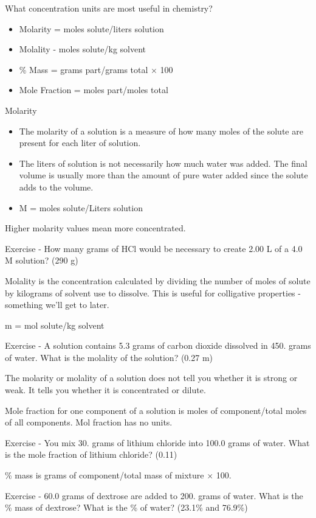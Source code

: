 \documentclass[../hchem.tex]{subfiles}
\begin{document}
What concentration units are most useful in chemistry?
\begin{itemize}
    \item Molarity = moles solute/liters solution 
    \item Molality - moles solute/kg solvent 
    \item \% Mass = grams part/grams total $\times$ 100 
    \item Mole Fraction = moles part/moles total 
\end{itemize}

Molarity 
\begin{itemize}
    \item The molarity of a solution is a measure of how many moles of the solute are present for each liter of solution.
    \item The liters of solution is not necessarily how much water was added. The final volume is usually more than the amount of pure water added since the solute adds to the volume.
    \item M = moles solute/Liters solution 
\end{itemize}

Higher molarity values mean more concentrated.

Exercise - How many grams of HCl would be necessary to create 2.00 L of a 4.0 M solution? (290 g)

Molality is the concentration calculated by dividing the number of moles of solute by kilograms of solvent use to dissolve.
This is useful for colligative properties - something we'll get to later.

m = mol solute/kg solvent 

Exercise - A solution contains 5.3 grams of carbon dioxide dissolved in 450. grams of water. What is the molality of the solution? (0.27 m)

The molarity or molality of a solution does not tell you whether it is strong or weak. It tells you whether it is concentrated or dilute.

Mole fraction for one component of a solution is moles of component/total moles of all components. Mol fraction has no units.

Exercise - You mix 30. grams of lithium chloride into 100.0 grams of water. What is the mole fraction of lithium chloride? (0.11)

\% mass is grams of component/total mass of mixture $\times$ 100.

Exercise - 60.0 grams of dextrose are added to 200. grams of water. What is the \% mass of dextrose? What is the \% of water? (23.1\% and 76.9\%)
\end{document}

